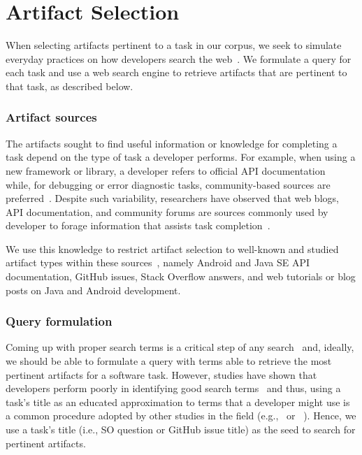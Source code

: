 
\section{Artifact Selection}
\label{cp4:corpus-artifacts}


When selecting artifacts pertinent to a task in our corpus, we seek to simulate everyday practices on how developers search the web~\cite{rao2020, Xia2017}.
We formulate a query for each task and use a web search engine to retrieve artifacts that are pertinent to that task, as described below.


\subsubsection{Artifact sources}



The artifacts sought to find useful information or knowledge for completing a task
 depend on the type of task a developer performs.
For example, when using a new framework or library, a developer refers to official API documentation~\cite{Li2013,robillard2011field} while, for debugging or error diagnostic tasks, community-based sources are preferred~\cite{Li2013,Breu2010}.
Despite such variability, researchers have observed that web blogs, API documentation, and community forums are sources
commonly used by developer to forage information that assists task completion~\cite{Li2013, josyula2018}.



We use this knowledge to restrict artifact selection to well-known and studied artifact types within these sources~\cite{Starke2009,Kevic2014, Li2013}, namely Android and Java SE API documentation, GitHub issues, Stack Overflow answers, and web tutorials or blog posts on Java and Android development.





\subsubsection{Query formulation}



Coming up with proper search terms is a critical step of any search~\cite{Haiduc2013}
and, ideally, we should be able to formulate a query with terms able to retrieve the most pertinent artifacts for a software task.
However, studies have shown that developers perform poorly in identifying good search terms~\cite{latoza2006, Starke2009,Kevic2014} and thus, using a task's title
as an educated approximation to terms that a developer might use is a common procedure adopted by other studies in the field (e.g.,~\cite{Xu2017} or ~\cite{silva2019}).
Hence, we use a task's title (i.e., SO question or GitHub issue title) as the seed to search for pertinent artifacts.



